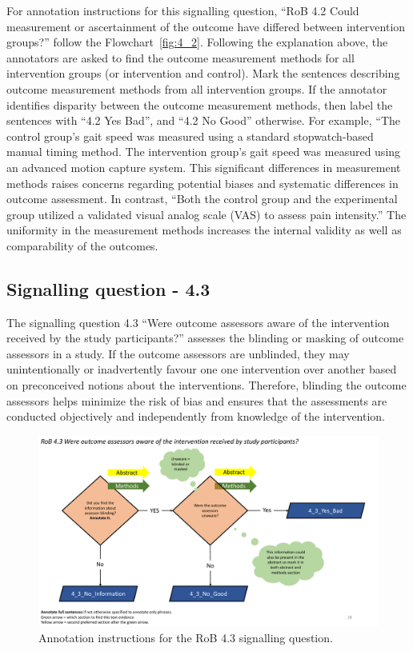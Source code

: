 \documentclass[sn-mathphys,Numbered]{sn-jnl}%
\begin{document}
For annotation instructions for this signalling question, ``RoB 4.2 Could measurement or ascertainment of the outcome have differed between intervention groups?'' follow the Flowchart~\ref{fig:4_2}.
Following the explanation above, the annotators are asked to find the outcome measurement methods for all intervention groups (or intervention and control).
Mark the sentences describing outcome measurement methods from all intervention groups.
If the annotator identifies disparity between the outcome measurement methods, then label the sentences with ``4.2 Yes Bad'', and ``4.2 No Good'' otherwise.
For example, ``The control group's gait speed was measured using a standard stopwatch-based manual timing method. The intervention group's gait speed was measured using an advanced motion capture system.
This significant differences in measurement methods raises concerns regarding potential biases and systematic differences in outcome assessment.
In contrast, ``Both the control group and the experimental group utilized a validated visual analog scale (VAS) to assess pain intensity.''
The uniformity in the measurement methods increases the internal validity as well as comparability of the outcomes.
%
%
%
\subsection*{Signalling question - 4.3 }
%
The signalling question 4.3 ``Were outcome assessors aware of the intervention received by the study participants?'' assesses the blinding or masking of outcome assessors in a study.
If the outcome assessors are unblinded, they may unintentionally or inadvertently favour one one intervention over another based on preconceived notions about the interventions.
Therefore, blinding the outcome assessors helps minimize the risk of bias and ensures that the assessments are conducted objectively and independently from knowledge of the intervention.
%
%
%
\begin{figure}[hbt]
    \centering
    \includegraphics[width=\textwidth]{figures/4_3.pdf}
    \caption{Annotation instructions for the RoB 4.3 signalling question.}
    \label{fig:4_3}
\end{figure}
%
%
%
\end{document}
